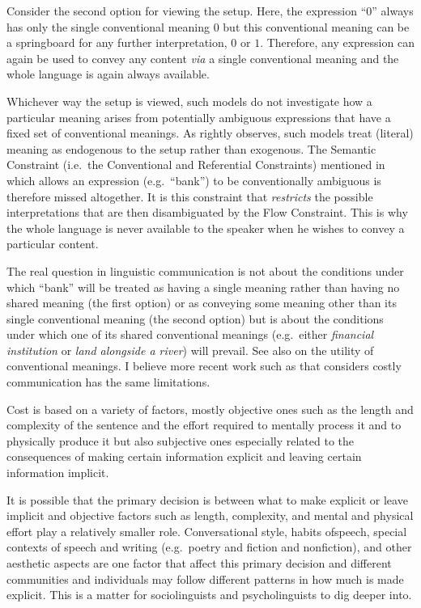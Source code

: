 {Consider the second option for viewing the setup. Here, the expression ``$0$'' always has only the single conventional meaning $0$ but this conventional meaning can be a springboard for any further interpretation, $0$ or $1$. Therefore, any expression can again be used to convey any content \emph{via} a single conventional meaning and the whole language is again always available.

Whichever way the setup is viewed, such models do not investigate how a particular meaning arises from potentially ambiguous expressions that have a fixed set of conventional meanings. As \citet[265]{myerson:cnscp} rightly observes, such models treat (literal) meaning as endogenous to the setup rather than exogenous. The Semantic Constraint (i.e.\ the Conventional and Referential Constraints) mentioned in  which allows an expression (e.g.\ ``bank'') to be conventionally ambiguous is therefore missed altogether. It is this constraint that \emph{restricts} the possible interpretations that are then disambiguated by the Flow Constraint. This is why the whole language is never available to the speaker when he wishes to convey a particular content. 

The real question in linguistic communication is not about the conditions under which ``bank'' will be treated as having a single meaning rather than having no shared meaning (the first option) or as conveying some meaning other than its single conventional meaning (the second option) but is about the conditions under which one of its shared conventional meanings (e.g.\ either \emph{financial institution} or \emph{land alongside a river}) will prevail. See also  on the utility of conventional meanings. I believe more recent work such as \citet{dt:mc} that considers costly communication has the same limitations.} Cost is based on a variety of factors, mostly objective ones such as the length and complexity of the sentence and the effort required to mentally process it and to physically produce it but also subjective ones especially related to the consequences of making certain information explicit and leaving certain information implicit. 

It is possible that the primary decision is between what to make explicit or leave implicit and objective factors such as length, complexity, and mental and physical effort play a relatively smaller role. Conversational style, habits of\linebreak speech, special contexts of speech and writing (e.g.\ poetry and fiction and nonfiction), and other aesthetic aspects are one factor that affect this primary decision and different communities and individuals may follow different patterns in how much is made explicit. This is a matter for sociolinguists and psycholinguists to dig deeper into. 

